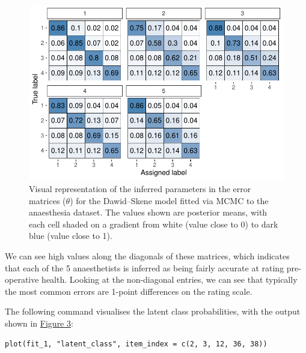 \begin{figure}

{\centering \includegraphics{RJ-2023-064_files/figure-latex/plot-theta-1} 

}

\caption{Visual representation of the inferred parameters in the error matrices ($\theta$) for the Dawid--Skene model fitted via MCMC to the anaesthesia dataset. The values shown are posterior means, with each cell shaded on a gradient from white (value close to 0) to dark blue (value close to 1).}\label{fig:plot-theta}
\end{figure}

We can see high values along the diagonals of these matrices, which indicates
that each of the 5 anaesthetists is inferred as being fairly accurate at rating
pre-operative health. Looking at the non-diagonal entries, we can see that
typically the most common errors are 1-point differences on the rating scale.

The following command visualises the latent class probabilities, with the
output shown in \protect\hyperlink{fig:plot-z}{Figure 3}:

\begin{verbatim}
plot(fit_1, "latent_class", item_index = c(2, 3, 12, 36, 38))
\end{verbatim}

